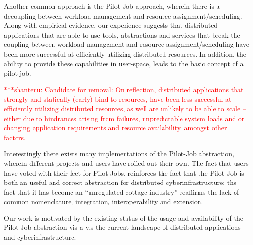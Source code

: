 \documentclass[conference,final]{IEEEtran}
\newcommand{\jhanote}[1]{ {\textcolor{red} { ***shantenu: #1 }}}
\newcommand{\jhanote}[1]{}
\begin{document}
Another common approach is the Pilot-Job approach, wherein there is a
decoupling between workload management and resource
assignment/scheduling.  Along with empirical evidence, our experience
suggests that distributed applications that are able to use tools,
abstractions and services that break the coupling between workload
management and resource assignment/scheduling have been more
successful at efficiently utilizing distributed resources.  In
addition, the ability to provide these capabilities in user-space, leads
to the basic concept of a pilot-job.



\jhanote{Candidate for removal: On reflection, distributed
  applications that strongly and statically (early) bind to resources,
  have been less successful at efficiently utilizing distributed
  resources, as well are unlikely to be able to scale -- either due to
  hindrances arising from failures, unpredictable system loads and or
  changing application requirements and resource availability, amongst
  other factors.}




Interestingly there exists many implementations of the Pilot-Job
abstraction, wherein different projects and users have rolled-out
their own. The fact that users have voted with their feet for
Pilot-Jobs, reinforces the fact that the Pilot-Job is both an useful
and correct abstraction for distributed cyberinfrastructure; the fact
that it has become an ``unregulated cottage industry'' reaffirms the
lack of common nomenclature, integration, interoperability and
extension.


Our work is motivated by the existing status of the usage and
availability of the Pilot-Job abstraction vis-a-vis the current
landscape of distributed applications and cyberinfrastructure.

\end{document}
